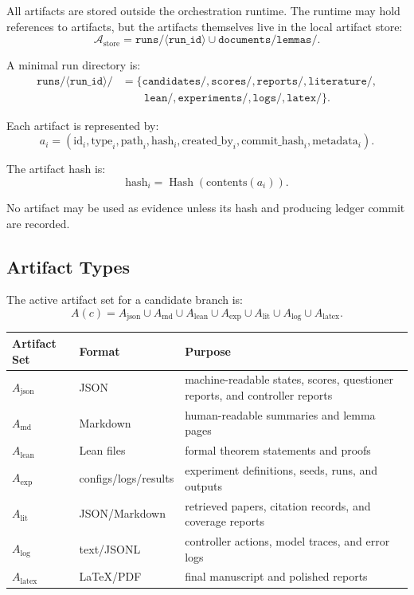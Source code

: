 \documentclass[11pt]{article}
\newcommand{\Hash}{\operatorname{Hash}}
\begin{document}
All artifacts are stored outside the orchestration runtime. The runtime may hold references to artifacts, but the artifacts themselves live in the local artifact store:
$$
\mathcal{A}_{\text{store}} = \texttt{runs/}\langle\texttt{run\_id}\rangle \cup \texttt{documents/lemmas/}.
$$

A minimal run directory is:
$$
\begin{aligned}
\texttt{runs/}\langle\texttt{run\_id}\rangle/ &= \{ \texttt{candidates/}, \texttt{scores/}, \texttt{reports/}, \texttt{literature/}, \\
&\qquad \texttt{lean/}, \texttt{experiments/}, \texttt{logs/}, \texttt{latex/} \}.
\end{aligned}
$$

Each artifact is represented by:
$$
a_i = ( \text{id}_i, \text{type}_i, \text{path}_i, \text{hash}_i, \text{created\_by}_i, \text{commit\_hash}_i, \text{metadata}_i ).
$$

The artifact hash is:
$$
\text{hash}_i=\Hash(\text{contents}(a_i)).
$$

No artifact may be used as evidence unless its hash and producing ledger commit are recorded.

\subsection{Artifact Types}

The active artifact set for a candidate branch is:
$$
A(c) = A_{\text{json}} \cup A_{\text{md}} \cup A_{\text{lean}} \cup A_{\text{exp}} \cup A_{\text{lit}} \cup A_{\text{log}} \cup A_{\text{latex}}.
$$

\begin{center}
\begin{tabular}{lll}
\toprule
Artifact Set & Format & Purpose \\
\midrule
$A_{\text{json}}$ & JSON & machine-readable states, scores, questioner reports, and controller reports \\
$A_{\text{md}}$ & Markdown & human-readable summaries and lemma pages \\
$A_{\text{lean}}$ & Lean files & formal theorem statements and proofs \\
$A_{\text{exp}}$ & configs/logs/results & experiment definitions, seeds, runs, and outputs \\
$A_{\text{lit}}$ & JSON/Markdown & retrieved papers, citation records, and coverage reports \\
$A_{\text{log}}$ & text/JSONL & controller actions, model traces, and error logs \\
$A_{\text{latex}}$ & LaTeX/PDF & final manuscript and polished reports \\
\bottomrule
\end{tabular}
\end{center}
\end{document}
